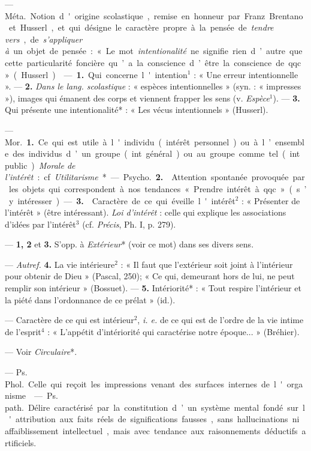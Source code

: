 \begin{itemize}[leftmargin=1cm, label=, itemsep=1pt]
 — \si{Méta.} Notion d'origine scolastique, remise en
honneur par Franz Brentano et Husserl, et qui désigne le caractère propre à
la pensée de {\it tendre vers}, de {\it s’appliquer à} un objet de pensée :
« Le mot {\it intentionalité} ne signifie rien d’autre que cette
particularité foncière qu’a la conscience d’être la conscience de
qqc. » (Husserl).

 — {\bf 1.} Qui concerne l'intention$^1$ : « Une erreur
intentionnelle ». — {\bf 2.} {\it Dans le lang. scolastique} : « espèces
intentionnelles » (syn. : « impresses »), images qui émanent des corps et
viennent frapper les sens (v. {\it Espèce}$^1$). —  {\bf 3.} Qui présente une
intentionalité* : « Les vécus intentionnels » (Husserl).

 — \si{Mor.} {\bf 1.} Ce qui est utile à l'individu (intérêt
personnel) ou à l’ensemble des individus d’un groupe (int. général) ou au
groupe comme tel (int. public). {\it Morale de l'intérêt} : cf.
{\it Utilitarisme}*.

— \si{Psycho.} {\bf 2.}  Attention spontanée provoquée par les
objets qui correspondent à nos tendances « Prendre intérêt à qqc. » (s’y
intéresser). — {\bf 3.}  Caractère de ce qui éveille
l'intérêt$^2$ : « Présenter de l'intérêt » (être intéressant). {\it Loi
d'intérêt} : celle qui explique les associations d'idées par l'intérêt$^3$
(cf. {\it Précis}, Ph. I, p. 279).

 — {\bf 1, 2} et {\bf 3.} S'opp. à
{\it Extérieur}* (voir ce mot) dans ses divers sens.

 — {\it Autref.} {\bf 4.} La vie intérieure$^2$ : « Il
faut que l’extérieur soit joint à l’intérieur pour obtenir de Dieu » (Pascal, 250); « Ce qui, demeurant hors de lui, ne peut remplir son
intérieur » (Bossuet). —  {\bf 5.} Intériorité* : « Tout respire l’intérieur
et la piété dans l’ordonnance de ce prélat » (id.).

 — Caractère de ce qui est intérieur$^2$, {\it i. e.} de ce
qui est de l’ordre de la vie intime de l'esprit$^4$ : « L'appétit
d'intériorité qui caractérise notre époque... » (Bréhier).

 — Voir {\it Circulaire}*.

 — Ps. \si{Phol.} Celle qui reçoit les
impressions venant des surfaces internes de l'organisme.

 — \si{Ps. path.} Délire caractérisé par la
constitution d’un système mental fondé sur l'attribution aux faits réels de
significations fausses, sans hallucinations ni affaiblissement intellectuel, %
mais avec tendance aux raisonnements déductifs artificiels.


\end{itemize}

